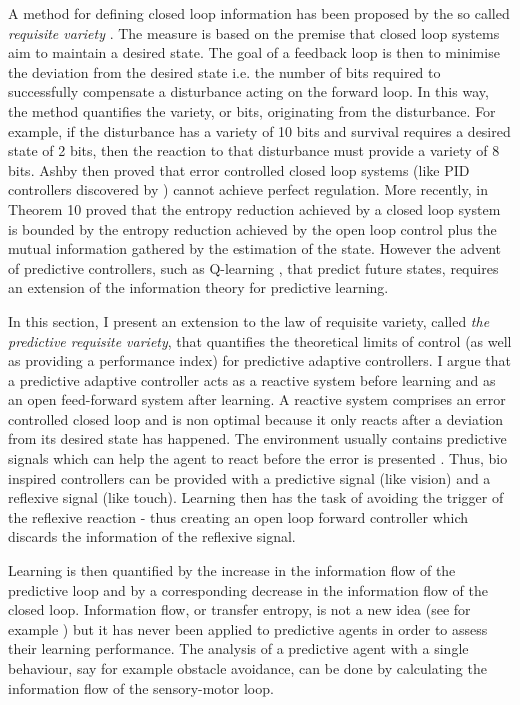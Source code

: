 A method for defining closed loop information has been proposed by \citet{Ashby1956:IntroCybernetics}
the so called \textit{requisite variety} .
The measure is based on the premise that closed loop systems aim to maintain
a desired state.
The goal of a feedback loop is then to minimise the deviation from the desired
state i.e. the number of bits required to successfully
compensate a disturbance acting on the forward loop. In this
way, the method quantifies the variety, or bits, originating from the
disturbance. For example, if the disturbance has a variety of 10 bits and
survival requires a desired state of 2 bits, then the reaction to that disturbance
must provide a variety of 8 bits.
Ashby then proved that error controlled closed loop systems (like PID controllers 
discovered by \citet{PID}) cannot achieve perfect regulation.
More recently, \citet{PhysRevLett.84.1156} in Theorem 10 proved
that the entropy reduction achieved by a closed loop system
is bounded by the entropy reduction achieved by the open loop control plus
the mutual information gathered by the estimation of the state.
However the advent of predictive controllers, such as Q-learning \citep{TD},
that predict future states, requires an extension of the information theory for
predictive learning.

In this section, I present an extension to
the law of requisite variety, called \textit{the predictive requisite variety},
that quantifies the theoretical limits of control (as well as providing a performance index)
for predictive adaptive controllers.
I argue that a predictive adaptive controller acts as a reactive system before learning
and as an open feed-forward system after learning.
A reactive system comprises an error controlled closed
loop and is non optimal because it only reacts after a
deviation from its desired state has happened.
The environment usually contains predictive signals which can help the agent to
react before the error is presented \citep{Verschure2003}. Thus, bio inspired controllers
can be provided with a predictive signal (like vision) and a reflexive signal (like touch).
Learning then has the task of avoiding the trigger of the reflexive reaction -
thus creating an open loop forward controller which discards
the information of the reflexive signal.

Learning is then quantified by the increase in the information flow of the predictive
loop and by a corresponding decrease in the information flow of the closed loop.
Information flow, or transfer entropy, is not a new idea (see for
example \citep{infoFlow,transferEntropy}) but it has never been applied to
predictive agents in order to assess their learning performance.
The analysis of a predictive agent with a single behaviour, say for
example obstacle avoidance, can be done by calculating the information flow of the
sensory-motor loop.


